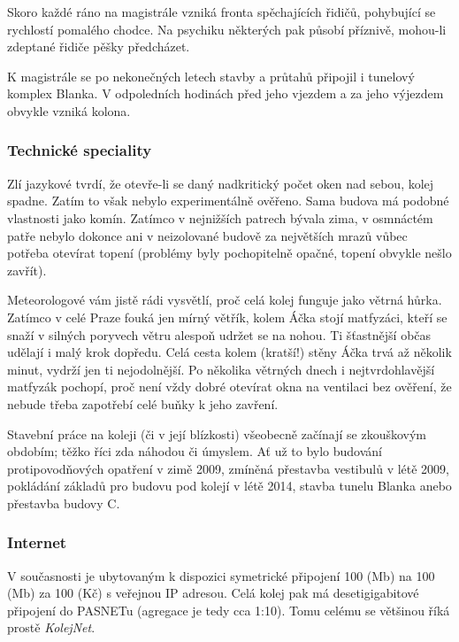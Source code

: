 Skoro každé ráno na magistrále vzniká fronta spěchajících řidičů, pohybující se
rychlostí pomalého chodce. Na psychiku některých pak působí příznivě, mohou-li
zdeptané řidiče pěšky předcházet.

K magistrále se po nekonečných letech stavby a průtahů připojil i tunelový
komplex Blanka. V odpoledních hodinách před jeho vjezdem a za jeho výjezdem
obvykle vzniká kolona.


\subsubsection{Technické speciality}

Zlí jazykové tvrdí, že otevře-li se daný nadkritický počet oken nad sebou, kolej
spadne. Zatím to však nebylo experimentálně ověřeno. Sama budova má podobné
vlastnosti jako komín. Zatímco v nejnižších patrech bývala zima, v osmnáctém
patře nebylo dokonce ani v neizolované budově za největších mrazů vůbec potřeba
otevírat topení (problémy byly pochopitelně opačné, topení obvykle nešlo
zavřít). 

Meteorologové vám jistě rádi vysvětlí, proč celá kolej funguje jako větrná
hůrka. Zatímco v celé Praze fouká jen mírný větřík, kolem Áčka stojí matfyzáci,
kteří se snaží v silných poryvech větru alespoň udržet se na nohou. Ti
šťastnější občas udělají i malý krok dopředu. Celá cesta kolem (kratší!) stěny
Áčka trvá až několik minut, vydrží jen ti nejodolnější. Po několika větrných
dnech i nejtvrdohlavější matfyzák pochopí, proč není vždy dobré otevírat okna na
ventilaci bez ověření, že nebude třeba zapotřebí celé buňky k jeho zavření.

Stavební práce na koleji (či v její blízkosti) všeobecně začínají se zkouškovým
obdobím; těžko říci zda náhodou či úmyslem. Ať už to bylo budování
protipovodňových opatření v zimě 2009, zmíněná přestavba vestibulů v létě 2009,
pokládání základů pro budovu pod kolejí v létě 2014, stavba tunelu Blanka anebo
přestavba budovy C.


\subsubsection{Internet}

V současnosti je ubytovaným k dispozici symetrické připojení 100 (Mb) na 100
(Mb) za 100 (Kč) s veřejnou IP adresou. Celá kolej pak má desetigigabitové
připojení do PASNETu (agregace je tedy cca 1:10). Tomu celému se většinou říká
prostě \textit{KolejNet}. 


